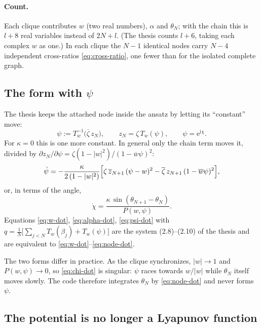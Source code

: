\documentclass[a4paper,11pt]{article}
\newcommand{\conj}[1]{\overline{#1}}
\newcommand{\T}{T}                       %
\newcommand{\e}{\mathrm{e}}
\newcommand{\ii}{\mathrm{i}}
\theoremstyle{remark}
\begin{document}
\paragraph{Count.} Each clique contributes $w$ (two real numbers), $\alpha$ and
$\theta_N$; with the chain this is $l+8$ real variables instead of $2N+l$. (The
thesis counts $l+6$, taking each complex $w$ as one.) In each clique the
$N-1$ identical nodes carry $N-4$ independent cross-ratios
\eqref{eq:cross-ratio}, one fewer than for the isolated complete graph.

\subsection{The form with $\psi$}

The thesis keeps the attached node inside the ansatz by letting its ``constant''
move:
\begin{equation}\label{eq:psi-def}
\psi:=\T_w^{-1}\bigl(\conj\zeta\,z_N\bigr),\qquad z_N=\zeta\,\T_w(\psi),\qquad \psi=\e^{\ii\chi}.
\end{equation}
For $\kappa=0$ this is one more constant. In general only the chain term moves
it, divided by $\partial z_N/\partial\psi=\zeta(1-|w|^2)/(1-\conj w\psi)^2$:
\begin{equation}\label{eq:psi-dot}
\dot\psi=-\frac{\kappa}{2\,(1-|w|^2)}
\Bigl[\zeta\,\conj z_{N+1}\,(\psi-w)^2-\conj\zeta\,z_{N+1}\,(1-\conj w\psi)^2\Bigr],
\end{equation}
or, in terms of the angle,
\begin{equation}\label{eq:chi-dot}
\dot\chi=\frac{\kappa\,\sin(\theta_{N+1}-\theta_N)}{P(w,\psi)} .
\end{equation}
Equations \eqref{eq:w-dot}, \eqref{eq:alpha-dot}, \eqref{eq:psi-dot} with
$q=\frac1N\bigl[\sum_{j<N}\T_w(\beta_j)+\T_w(\psi)\bigr]$ are the system
(2.8)--(2.10) of the thesis and are equivalent to
\eqref{eq:w-dot}--\eqref{eq:node-dot}.

The two forms differ in practice. As the clique synchronizes, $|w|\to1$ and
$P(w,\psi)\to0$, so \eqref{eq:chi-dot} is singular: $\psi$ races towards
$w/|w|$ while $\theta_N$ itself moves slowly. The code therefore integrates
$\theta_N$ by \eqref{eq:node-dot} and never forms $\psi$.

\subsection{The potential is no longer a Lyapunov function}
\end{document}
